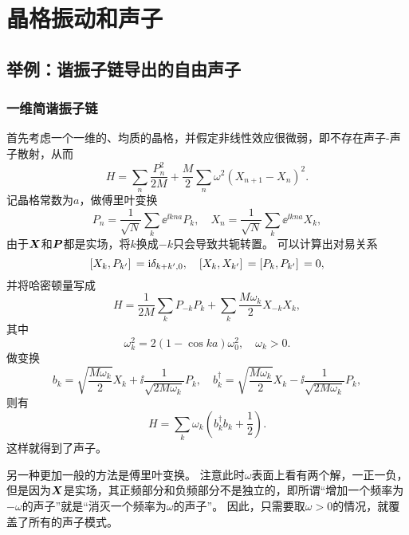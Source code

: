 \section{晶格振动和声子}\label{sec:phonon}

\subsection{举例：谐振子链导出的自由声子}

\subsubsection{一维简谐振子链}

首先考虑一个一维的、均质的晶格，并假定非线性效应很微弱，即不存在声子-声子散射，从而
\begin{equation}
    {H} = \sum_n \frac{{P}_n^2}{2 M} + \frac{M}{2} \sum_{n} \omega^2 ({X}_{n+1} - {X}_{n})^2.
    \label{eq:one-dim-osc-hamiltonian}
\end{equation}
记晶格常数为$a$，做傅里叶变换
\[
    {P}_n = \frac{1}{\sqrt{N}} \sum_{k} \ee^{\ii k n a} {P}_k, \quad {X}_n = \frac{1}{\sqrt{N}} \sum_{k} \ee^{\ii k n a} {X}_k,
\]
由于$\vb*{X}$和$\vb*{P}$都是实场，将$k$换成$-k$只会导致共轭转置。
可以计算出对易关系
\begin{equation}
    \comm*{{X}_{k}}{{P}_{k'}} = \ii \delta_{k+k', 0}, \quad \comm*{{X}_{k}}{{X}_{k'}} = \comm*{{P}_{k}}{{P}_{k'}} = 0,
\end{equation}
并将哈密顿量写成
\[
    {H} = \frac{1}{2M} \sum_{k} {P}_{-k} {P}_{k} + \sum_k \frac{M \omega_{k}}{2} {X}_{-k} {X}_k,
\]
其中
\begin{equation}
    \omega_k^2 = 2 (1 - \cos k a) \omega_0^2, \quad \omega_k > 0.
\end{equation}
做变换
\begin{equation}
    {b}_{k} = \sqrt{\frac{M \omega_k}{2}} {X}_k + \ii \frac{1}{\sqrt{2 M \omega_k}} P_k, \quad {b}^\dagger_{k} = \sqrt{\frac{M \omega_k}{2}} {X}_k - \ii \frac{1}{\sqrt{2 M \omega_k}} P_k,
\end{equation}
则有
\begin{equation}
    {H} = \sum_k \omega_k \left({b}^\dagger_k {b}_k + \frac{1}{2}\right).
\end{equation}
这样就得到了声子。

另一种更加一般的方法是傅里叶变换。%
注意此时$\omega$表面上看有两个解，一正一负，但是因为$\vb*{X}$是实场，其正频部分和负频部分不是独立的，即所谓“增加一个频率为$-\omega$的声子”就是“消灭一个频率为$\omega$的声子”。
因此，只需要取$\omega > 0$的情况，就覆盖了所有的声子模式。

